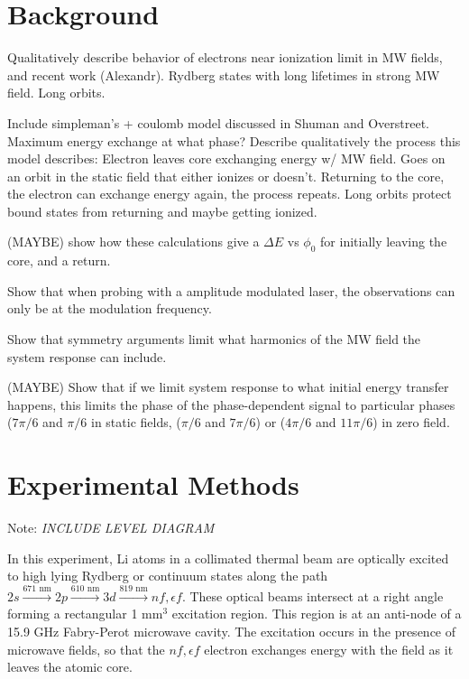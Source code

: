 \documentclass[aps,pra,preprint,groupedaddress]{revtex4-1}
\begin{document}
\section{\label{sec:back} Background}

Qualitatively describe behavior of electrons near ionization limit in MW fields, and recent work (Alexandr). Rydberg states with long lifetimes in strong MW field. Long orbits.

Include simpleman's + coulomb model discussed in Shuman and Overstreet. Maximum energy exchange at what phase? Describe qualitatively the process this model describes: Electron leaves core exchanging energy w/ MW field. Goes on an orbit in the static field that either ionizes or doesn't. Returning to the core, the electron can exchange energy again, the process repeats. Long orbits protect bound states from returning and maybe getting ionized.

(MAYBE) show how these calculations give a $\Delta E$ vs $\phi_0$ for initially leaving the core, and a return.

Show that when probing with a amplitude modulated laser, the observations can only be at the modulation frequency.

Show that symmetry arguments limit what harmonics of the MW field the system response can include.

(MAYBE) Show that if we limit system response to what initial energy transfer happens, this limits the phase of the phase-dependent signal to particular phases ($7\pi/6$ and $\pi/6$ in static fields, ($\pi/6$ and $7\pi/6$) or ($4\pi/6$ and $11\pi/6$) in zero field.

\section{\label{sec:exp} Experimental Methods}

Note: \emph{INCLUDE LEVEL DIAGRAM}

In this experiment, Li atoms in a collimated thermal beam are optically excited to high lying Rydberg or continuum states along the path $2s \xrightarrow{\text{671 nm}} 2p \xrightarrow{\text{610 nm}} 3d \xrightarrow{\text{819 nm}} nf, \epsilon f$. These optical beams intersect at a right angle forming a rectangular 1 mm$^3$ excitation region. This region is at an anti-node of a 15.9 GHz Fabry-Perot microwave cavity. The excitation occurs in the presence of microwave fields, so that the $nf, \epsilon f$ electron exchanges energy with the field as it leaves the atomic core.
\end{document}
